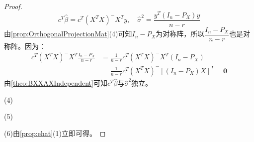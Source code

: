 \begin{proof}
\begin{equation*}
		c^T\hat{\beta}=c^T(X^TX)^-X^Ty,\quad\hat{\sigma}^2=\frac{y^T(I_n-P_X)y}{n-r}
	\end{equation*}
	由\cref{prop:OrthogonalProjectionMat}(4)可知$I_n-P_X$为对称阵，所以$\dfrac{I_n-P_X}{n-r}$也是对称阵。因为：
	\begin{align*}
		c^T(X^TX)^-X^T\frac{I_n-P_X}{n-r}&=\frac{1}{n-r}c^T(X^TX)^-X^T(I_n-P_X) \\
		&=\frac{1}{n-r}c^T(X^TX)^-[(I_n-P_X)X]^T=\mathbf{0}
	\end{align*}
	由\cref{theo:BXXAXIndependent}可知$c^T\hat{\beta}$与$\hat{\sigma}^2$独立。\par
	(4)\par
	(5)\par
	(6)由\cref{prop:ehat}(1)立即可得。
\end{proof}

